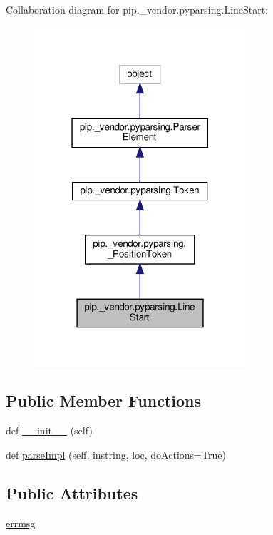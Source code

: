 Collaboration diagram for pip.\+\_\+vendor.\+pyparsing.\+Line\+Start\+:
\nopagebreak
\begin{figure}[H]
\begin{center}
\leavevmode
\includegraphics[width=223pt]{classpip_1_1__vendor_1_1pyparsing_1_1LineStart__coll__graph}
\end{center}
\end{figure}
\subsection*{Public Member Functions}
\begin{DoxyCompactItemize}
\item 
def \hyperlink{classpip_1_1__vendor_1_1pyparsing_1_1LineStart_ab6fdf052fc859fd7e31729a7f0af69e6}{\+\_\+\+\_\+init\+\_\+\+\_\+} (self)
\item 
def \hyperlink{classpip_1_1__vendor_1_1pyparsing_1_1LineStart_a5a9153f1c870aff8e6d3e06a6194e776}{parse\+Impl} (self, instring, loc, do\+Actions=True)
\end{DoxyCompactItemize}
\subsection*{Public Attributes}
\begin{DoxyCompactItemize}
\item 
\hyperlink{classpip_1_1__vendor_1_1pyparsing_1_1LineStart_ad9b19c00c304ffb0a9ce78b48b151bd2}{errmsg}
\end{DoxyCompactItemize}
